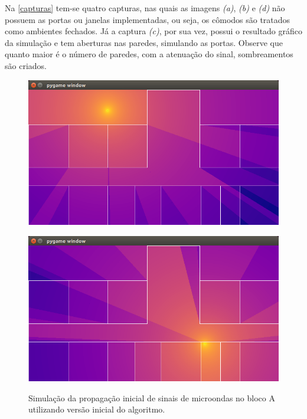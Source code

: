 \documentclass[
	12pt,				%
	twoside,			%
	a4paper,			%
	english,			%
	french,				%
	spanish,			%
	brazil				%
	]{abntex2}
\begin{document}
Na \autoref{capturas} tem-se quatro capturas, nas quais as imagens
\emph{(a)}, \emph{(b)} e \emph{(d)} não possuem as portas ou janelas
implementadas, ou seja, os cômodos são tratados como ambientes fechados.
Já a captura \emph{(c)}, por sua vez, possui o resultado gráfico da
simulação e tem aberturas nas paredes, simulando as portas. Observe que
quanto maior é o número de paredes, com a atenuação do sinal,
sombreamentos são criados.

\begin{figure}[htb]
    
    \caption{\label{capturas} Simulação da propagação inicial de sinais de microondas no bloco A utilizando versão inicial do algoritmo.}
    \centering
    \begin{minipage}{0.4\textwidth}
        \centering \label{captura_1}
        \includegraphics[scale=0.28]{imagens/captura-1.jpg}
    \end{minipage}
    \hfill
    \begin{minipage}{0.4\textwidth}
        \centering \label{captura_2}
        \includegraphics[scale=0.28]{imagens/captura-2.jpg}

\end{minipage}
\end{figure}
\end{document}
